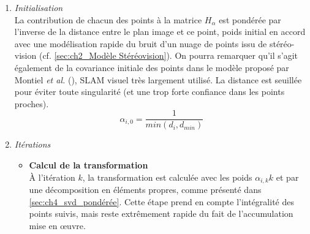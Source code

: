 \begin{enumerate}
	\item {\emph{Initialisation}}\\
	La contribution de chacun des points à la matrice $H_\alpha$ est pondérée par l'inverse de la distance entre le plan image et ce point, poids initial en accord avec une modélisation rapide du bruit d'un nuage de points issu de stéréo-vision (cf. \ref{sec:ch2_Modèle Stéréovision}). On pourra remarquer qu'il s'agit également de la covariance initiale des points dans le modèle proposé par Montiel \textit{et al.} (\cite{Montiel}), SLAM visuel très largement utilisé. La distance est seuillée pour éviter toute singularité (et une trop forte confiance dans les points proches).
	\begin{equation}
		\alpha_{i,0} = \frac{1}{min(d_i, d_{min})}
	\end{equation}

	\item {\emph{Itérations}}
	\begin{itemize}
		\item{\textbf{Calcul de la transformation}}\\
		À l'itération $k$, la transformation est calculée avec les poids ${\alpha_{i,k}}k$ et par une décomposition en éléments propres, comme présenté dans \ref{sec:ch4_svd_pondérée}. Cette étape prend en compte l'intégralité des points suivis, mais reste extrêmement rapide du fait de l'accumulation mise en œuvre.\\
		

\end{itemize}
\end{enumerate}
